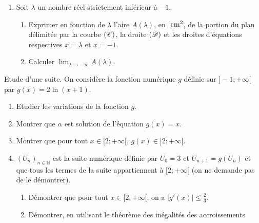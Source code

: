 \begin{description}
\begin{enumerate}
                                    On donne $\expo{} = 2,7$ ; $\expo{\frac{3}{2}} = 4,48$ et pour la construction,
                                    on prendra $\alpha = 2,5$.
                        \item Soit $\lambda$ un nombre r\'eel strictement inf\'erieur \`a $-1$.
                              \begin{enumerate}
                                    \item Exprimer en fonction de $\lambda$ l'aire $A(\lambda)$, en $~\mathrm{cm}^2$,
                                          de la portion du plan d\'elimit\'ee par la courbe $(\mathscr{C})$,
                                          la droite $(\mathscr{D})$ et les droites d'\'equations respectives $x=\lambda$ et $x = -1$.
                                    \item Calculer $\lim_{\lambda\rightarrow -\infty} A(\lambda)$.
                              \end{enumerate}
                  \end{enumerate}
            \item[Partie B : ] Etude d'une suite. \newline
                  On consid\`ere la fonction num\'erique $g$ d\'efinie sur $]-1 ; +\infty[$ par $g(x) = 2 \ln (x+1)$.
                  \begin{enumerate}
                        \item Etudier les variations de la fonction $g$.
                        \item Montrer que $\alpha$ est solution de l'\'equation $g(x) = x$.
                        \item Montrer que pour tout $x \in [2 ; +\infty[$, $g(x) \in ]2 ; +\infty[$.
                        \item $(U_n)_{n\in\mathbb{N}}$ est la suite num\'erique d\'efinie par $U_0 = 3$
                              et $U_{n+1} = g(U_n)$ et que tous les termes de la suite appartiennent \`a $[2;+\infty[$
                              (on ne demande pas de le d\'emontrer).
                              \begin{enumerate}
                                    \item D\'emontrer que pour tout $x \in [ 2; +\infty[$, on a $|g'(x)| \leq \frac{2}{3}$.
                                    \item D\'emontrer, en utilisant le th\'eor\`eme des in\'egalit\'es des accroissements

\end{enumerate}
\end{enumerate}
\end{description}
